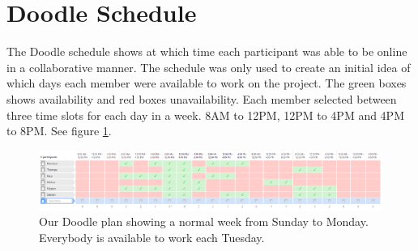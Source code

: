 \section{Doodle Schedule} \label{sec:appendix-doodle-schedule}
The Doodle schedule shows at which time each participant was able to be online in a collaborative manner. The schedule was only used to create an initial idea of which days each member were available to work on the project. The green boxes shows availability and red boxes unavailability. Each member selected between three time slots for each day in a week. 8AM to 12PM, 12PM to 4PM and 4PM to 8PM. See figure \ref{fig:appendix-doodle-schedule}.
\begin{figure}[ht!]
\centering
\includegraphics[width=\columnwidth]{images/doodle-plan.png}
\caption{Our Doodle plan showing a normal week from Sunday to Monday. Everybody is available to work each Tuesday.}
\label{fig:appendix-doodle-schedule}
\end{figure}
